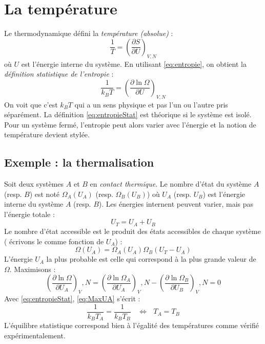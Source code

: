 \documentclass	[11pt, a4paper, openany]{book}
\begin{document}
		\section{La température}
		Le thermodynamique défini la \textit{température (absolue)} :
		\begin{equation}
			\frac{1}{T} = \left(\dfrac{\partial S}{\partial U}\right)_{V,N}
		\end{equation}
		où $U$ est l'énergie interne du système. En utilisant \autoref{eq:entropie}, on obtient la \textit{
		définition statistique de l'entropie} :
		\begin{equation}
			\frac{1}{k_BT} = \left(\dfrac{\partial \ln\Omega}{\partial U}\right)_{V,N}
			\label{eq:entropieStat}
		\end{equation}
		On voit que c'est $k_BT$ qui a un sens physique et pas l'un ou l'autre pris séparément. La 
		définition \autoref{eq:entropieStat} est théorique si le système est isolé. Pour un système 
		fermé, l'entropie peut alors varier avec l'énergie et la notion de température devient stylée.
		
		\subsection*{Exemple : la thermalisation}
		Soit deux systèmes $A$ et $B$ en \textit{contact thermique}. Le nombre d'état du système
		$A$ (resp. $B$) est noté $\Omega_A(U_A)$ (resp. $\Omega_B(U_B)$) où $U_A$ (resp. $U_B$) est 
		l'énergie interne du système $A$ (resp. $B$). Les énergies internent peuvent varier, mais 
		pas l'énergie totale :
		\begin{equation}
			U_T = U_A+U_B
		\end{equation}
		Le nombre d'état accessible est le produit des états accessibles de chaque système (
		écrivons le comme fonction de $U_A$) :
		\begin{equation}
			\Omega(U_A) = \Omega_A(U_A)\Omega_B(U_T-U_A)
		\end{equation}
		L'énergie $U_A$ la plus probable est celle qui correspond à la plus grande valeur de $
		\Omega$. Maximisons :
		\begin{equation}
			\left(\dfrac{\partial \ln\Omega}{\partial U_A}\right)_V,N =	\left(\dfrac{\partial \ln\Omega_A}
			{\partial U_A}\right)_V,N - 	\left(\dfrac{\partial \ln\Omega_B}{\partial U_B}\right)_V,N = 0
			\label{eq:MaxUA}
		\end{equation}
		Avec \autoref{eq:entropieStat}, \autoref{eq:MaxUA} s'écrit :
		\begin{equation}
			\frac{1}{k_BT_A} = \frac{1}{k_BT_B}\ \ \ \ \Leftrightarrow\ \ \ T_A = T_B
		\end{equation}
		L'équilibre statistique correspond bien à l'égalité des températures comme vérifié
		expérimentalement.
			
\end{document}
